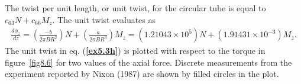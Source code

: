 \documentclass{AeroStructure-ERJohnson}
\begin{document}
\begin{example}
The twist per unit length, or unit twist, for the circular tube is
equal to $c_{63} N+c_{66} M_{z}$. The unit twist evaluates as
\begin{align}\label{ex5.3h}
\frac{d \phi_{z}}{d z}=\left(\frac{-b}{2 \pi B R^{2}}\right)
N+\left(\frac{a}{2 \pi B R^{3}}\right) M_{z}=(1.21043 \times
10^{5}) N+(1.91431 \times 10^{-3})
M_{z}.\tag{h}
\end{align}
The unit twist in eq. (\textbf{\ref{ex5.3h}}) is plotted with respect to
the torque in figure~\ref{fig8.6} for two values of the axial
force. Discrete measurements from the experiment reported by Nixon
(1987) are shown by filled circles in the plot.
\end{example}

\end{document}

